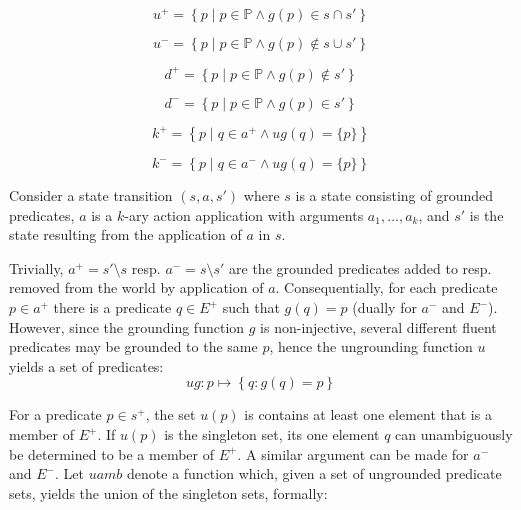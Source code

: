 \documentclass[../Master.tex]{subfiles}
\begin{document}
\begin{equation}
    u^+ = \left\{
        p \; | \; p \in \mathbb{P} \land g(p) \in s \cap s'
    \right\}
\end{equation}

\begin{equation}
    u^- = \left\{
        p \; | \; p \in \mathbb{P} \land g(p) \notin s \cup s'
    \right\}
\end{equation}

\begin{equation}
    d^+ = \left\{
        p \; | \; p \in \mathbb{P} \land g(p) \notin s'
    \right\}
\end{equation}

\begin{equation}
    d^- = \left\{
        p \; | \; p \in \mathbb{P} \land g(p) \in s'
    \right\}
\end{equation}

\begin{equation}
    k^+ = \left\{
        p \; | \; q \in a^+ \land ug(q) = \{ p \}
    \right\}
\end{equation}

\begin{equation}
    k^- = \left\{
        p \; | \; q \in a^- \land ug(q) = \{ p \}
    \right\}
\end{equation}

    Consider a state transition $\left(s,a,s'\right)$ where $s$ is a
state consisting of grounded predicates, $a$ is a $k$-ary action
application with arguments $a_{1},\dots,a_{k}$, and $s'$ is the
state resulting from the application of $a$ in $s$.

Trivially, $a^{+}=s'\setminus s$ resp. $a^{-}=s\setminus s'$ are
the grounded predicates added to resp. removed from the world by application
of $a$. Consequentially, for each predicate $p\in a^{+}$ there is
a predicate $q\in E^{+}$ such that $g\left(q\right)=p$ (dually for
$a^{-}$ and $E^{-}$). However, since the grounding function $g$
is non-injective, several different fluent predicates may be grounded
to the same $p$, hence the ungrounding function $u$ yields a set
of predicates:
\[
ug:p\mapsto\left\{ q:g\left(q\right)=p\right\}
\]


For a predicate $p\in s^{+}$, the set $u\left(p\right)$ is contains
at least one element that is a member of $E^{+}$. If $u\left(p\right)$
is the singleton set, its one element $q$ can unambiguously be determined
to be a member of $E^{+}$. A similar argument can be made for $a^{-}$
and $E^{-}$. Let $uamb$ denote a function which, given a set of
ungrounded predicate sets, yields the union of the singleton sets,
formally:
\end{document}
